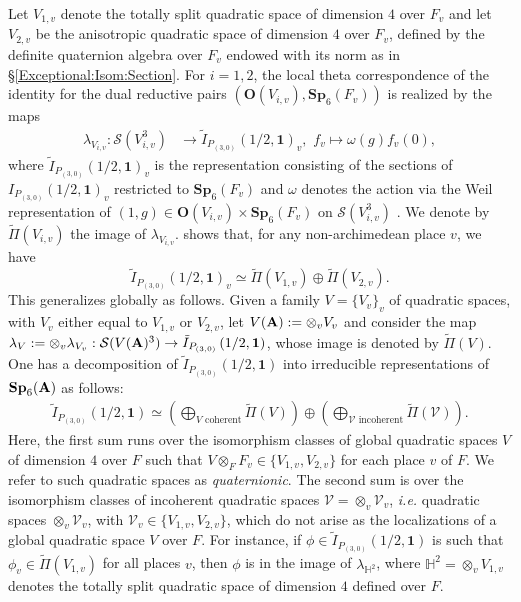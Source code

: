 \documentclass[11pt, reqno]{amsart}
\theoremstyle{plain}
\theoremstyle{definition}
\theoremstyle{remark}
\theoremstyle{plain}
\def\A{{\bf A}}
\def\Sp{{\mathbf{Sp}}}
\begin{document}
Let $V_{1,v}$ denote the totally split quadratic space of dimension $4$ over $F_v$ and let $V_{2,v}$ be the anisotropic quadratic space of dimension $4$ over $F_v$, defined by the definite quaternion algebra over $F_v$ endowed with its norm as in \S \ref{Exceptional:Isom:Section}. For $i = 1,2$, the local theta correspondence of the identity for the dual reductive pairs $(\mathbf{O}(V_{i,v}),\Sp_6(F_v))$ is realized by the maps
\begin{align*}\lambda_{V_{i,v}}:\mathcal{S}(V_{i,v}^3)&\to \tilde{I}_{P_{(3,0)}}\left(1/2,\mathbf{1}\right)_v,\, \, f_v \mapsto \omega(g)f_v(0),\end{align*}
where $\tilde{I}_{P_{(3,0)}}\left(1/2,\mathbf{1}\right)_v$ is the representation consisting of the sections of $I_{P_{(3,0)}}\left(1/2,\mathbf{1}\right)_v$ restricted to $\Sp_6(F_v)$  and $\omega$ denotes the action via the Weil representation of $(1, g) \in  \mathbf{O}(V_{i,v})\times\Sp_6(F_v)$ on $\mathcal{S}(V_{i,v}^3)$ . We denote by $\tilde{\Pi}(V_{i,v})$ the image of $\lambda_{V_{i,v}}$. \cite[Theorem 2.2 (iii)]{KudlaRallis} shows that, for any non-archimedean place $v$, we have \[\tilde{I}_{P_{(3,0)}}\left(1/2,\mathbf{1}\right)_v \simeq \tilde{\Pi}(V_{1,v})\oplus\tilde{\Pi}(V_{2,v}).\]
This generalizes globally as follows. Given a family $V=\{V_v\}_v$ of quadratic spaces, with $V_v$ either equal to $V_{1,v}$ or $V_{2,v}$, let $V(\A) := \otimes_v V_v$ and consider the map $\lambda_{V} := \otimes_v\lambda_{V_v}:\mathcal{S}(V(\A)^3)\to \tilde{I}_{P_{(3,0)}}\left(1/2,\mathbf{1}\right)$, whose image is denoted by $\tilde{\Pi}(V)$. One has a decomposition of $\tilde{I}_{P_{(3,0)}}\left(1/2,\mathbf{1}\right)$ into irreducible representations of $\Sp_6(\A)$ as follows: 
\begin{align}\label{thetadecSp6}
\tilde{I}_{P_{(3,0)}}\left(1/2,\mathbf{1}\right) \simeq \left(\bigoplus_{V\text{ coherent}} \tilde{\Pi}(V)\right)\oplus \left(\bigoplus_{\mathcal{V}\text{ incoherent}} \tilde{\Pi}(\mathcal{V})\right).
\end{align}
Here, the first sum runs over the isomorphism classes of global quadratic spaces $V$ of dimension $4$ over $F$ such that $V \otimes_F F_v \in \{ V_{1,v},V_{2,v}\}$ for each place $v$ of $F$. We refer to such quadratic spaces as \textit{quaternionic}. The second sum is over the isomorphism classes of incoherent quadratic spaces $\mathcal{V} = \otimes_v \mathcal{V}_v$, \textit{i.e.} quadratic spaces $\otimes_v \mathcal{V}_v$, with $\mathcal{V}_v \in \{ V_{1,v},V_{2,v}\}$, which do not arise as the localizations of a global quadratic space $V$ over $F$. 
For instance, if $\phi \in \tilde{I}_{P_{(3,0)}}\left(1/2,\mathbf{1}\right)$ is such that $\phi_v \in \tilde{\Pi}(V_{1,v})$ for all places $v$, then $\phi$ is in the image of $\lambda_{\mathbb{H}^2}$, where $\mathbb{H}^2 = \otimes_v V_{1,v}$ denotes the totally split quadratic space of dimension $4$ defined over $F$. 
\end{document}
